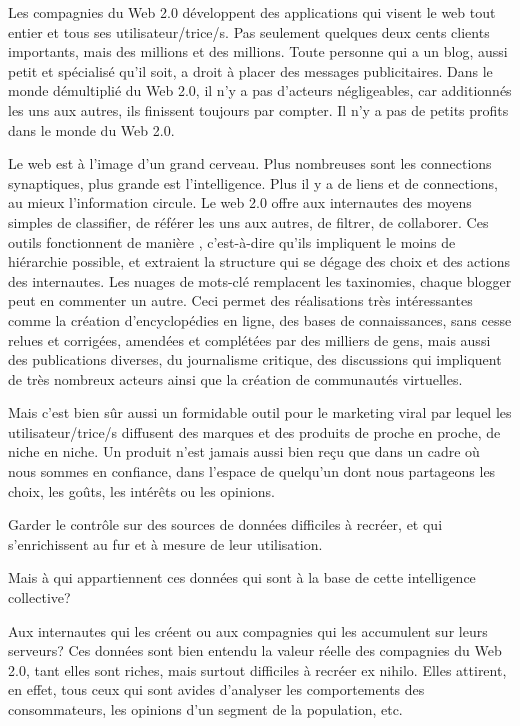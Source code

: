 {\page

Les compagnies du Web 2.0 d\'eveloppent des applications qui visent le
web tout entier et tous ses utilisateur/trice/s. Pas seulement quelques
deux cents clients importants, mais des millions et des millions. Toute
personne qui a un blog, aussi petit et sp\'ecialis\'e
qu'il soit, a droit \`a placer des messages
publicitaires. Dans le monde d\'emultipli\'e du Web 2.0, il
n'y a pas d'acteurs n\'egligeables,
car additionn\'es les uns aux autres, ils finissent toujours par
compter. Il n'y a pas de petits profits dans le monde
du Web 2.0.

Le web est \`a l'image d'un grand
cerveau. Plus nombreuses sont les connections synaptiques, plus grande
est l'intelligence. Plus il y a de liens et de
connections, au mieux l'information circule. Le web
2.0 offre aux internautes des moyens simples de classifier, de
r\'ef\'erer les uns aux autres, de filtrer, de collaborer. Ces outils
fonctionnent de mani\`ere ,
c'est{}-\`a{}-dire qu'ils impliquent
le moins de hi\'erarchie possible, et extraient la structure qui se
d\'egage des choix et des actions des internautes. Les nuages de
mots{}-cl\'e remplacent les taxinomies, chaque blogger peut en
commenter un autre. Ceci permet des r\'ealisations tr\`es
int\'eressantes comme la cr\'eation d'encyclop\'edies
en ligne, des bases de connaissances, sans cesse relues et corrig\'ees,
amend\'ees et compl\'et\'ees par des milliers de gens, mais aussi des
publications diverses, du journalisme critique, des discussions qui
impliquent de tr\`es nombreux acteurs ainsi que la cr\'eation de
communaut\'es virtuelles.

Mais c'est bien s\^ur aussi un formidable outil pour le
marketing viral par lequel les utilisateur/trice/s diffusent des
marques et des produits de proche en proche, de niche en niche. Un
produit n'est jamais aussi bien re\c{c}u que dans un
cadre o\`u nous sommes en confiance, dans l'espace de
quelqu'un dont nous partageons les choix, les go\^uts,
les int\'er\^ets ou les opinions.

Garder le contr\^ole sur des sources de donn\'ees difficiles \`a
recr\'eer, et qui s'enrichissent au fur et \`a mesure
de leur utilisation.

Mais \`a qui appartiennent ces donn\'ees qui sont \`a la base de cette
intelligence collective?

Aux internautes qui les cr\'eent ou aux compagnies qui les accumulent
sur leurs serveurs? Ces donn\'ees sont bien entendu la valeur r\'eelle
des compagnies du Web 2.0, tant elles sont riches, mais surtout
difficiles \`a recr\'eer ex nihilo. Elles attirent, en effet, tous ceux
qui sont avides d'analyser les comportements des
consommateurs, les opinions d'un segment de la
population, etc.

}
